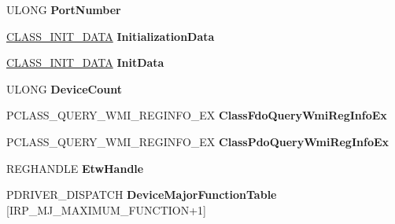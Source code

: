 \begin{DoxyCompactItemize}
U\+L\+O\+NG {\bfseries Port\+Number}
\item 
\mbox{\label{struct___c_l_a_s_s___d_r_i_v_e_r___e_x_t_e_n_s_i_o_n_a4cf3495a2991e9023f73656b001021d0}} 
\hyperlink{struct___c_l_a_s_s___i_n_i_t___d_a_t_a}{C\+L\+A\+S\+S\+\_\+\+I\+N\+I\+T\+\_\+\+D\+A\+TA} {\bfseries Initialization\+Data}
\item 
\mbox{\label{struct___c_l_a_s_s___d_r_i_v_e_r___e_x_t_e_n_s_i_o_n_a38fcc9c4d815e1eb971e6336b6a2e8d2}} 
\hyperlink{struct___c_l_a_s_s___i_n_i_t___d_a_t_a}{C\+L\+A\+S\+S\+\_\+\+I\+N\+I\+T\+\_\+\+D\+A\+TA} {\bfseries Init\+Data}
\item 
\mbox{\label{struct___c_l_a_s_s___d_r_i_v_e_r___e_x_t_e_n_s_i_o_n_a577b6accd4d8dadf2cecb519d0e146e6}} 
U\+L\+O\+NG {\bfseries Device\+Count}
\item 
\mbox{\label{struct___c_l_a_s_s___d_r_i_v_e_r___e_x_t_e_n_s_i_o_n_a4b9cf42368e76e507f23e0ebc128e142}} 
P\+C\+L\+A\+S\+S\+\_\+\+Q\+U\+E\+R\+Y\+\_\+\+W\+M\+I\+\_\+\+R\+E\+G\+I\+N\+F\+O\+\_\+\+EX {\bfseries Class\+Fdo\+Query\+Wmi\+Reg\+Info\+Ex}
\item 
\mbox{\label{struct___c_l_a_s_s___d_r_i_v_e_r___e_x_t_e_n_s_i_o_n_a557d2165db9140193f1a2fbb830f4ac3}} 
P\+C\+L\+A\+S\+S\+\_\+\+Q\+U\+E\+R\+Y\+\_\+\+W\+M\+I\+\_\+\+R\+E\+G\+I\+N\+F\+O\+\_\+\+EX {\bfseries Class\+Pdo\+Query\+Wmi\+Reg\+Info\+Ex}
\item 
\mbox{\label{struct___c_l_a_s_s___d_r_i_v_e_r___e_x_t_e_n_s_i_o_n_aaa15d7dd05d780460499ae1388f7628d}} 
R\+E\+G\+H\+A\+N\+D\+LE {\bfseries Etw\+Handle}
\item 
\mbox{\label{struct___c_l_a_s_s___d_r_i_v_e_r___e_x_t_e_n_s_i_o_n_ad804ccd176ccc63f56e2aafdd870a2c9}} 
P\+D\+R\+I\+V\+E\+R\+\_\+\+D\+I\+S\+P\+A\+T\+CH {\bfseries Device\+Major\+Function\+Table} \mbox{[}I\+R\+P\+\_\+\+M\+J\+\_\+\+M\+A\+X\+I\+M\+U\+M\+\_\+\+F\+U\+N\+C\+T\+I\+ON+1\mbox{]}
\item 

\end{DoxyCompactItemize}
